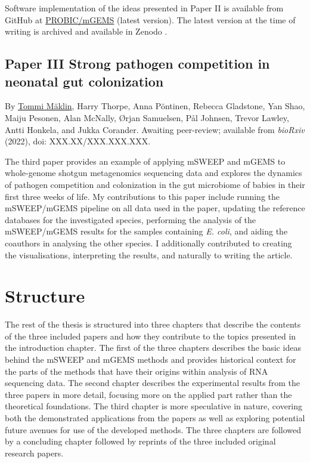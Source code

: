 \documentclass[officiallayout]{tktla}
\begin{document}
Software implementation of the ideas presented in Paper II is
available from GitHub at
\href{https://github.com/PROBIC/mGEMS}{PROBIC/mGEMS} (latest version).
The latest version at the time of writing is archived and available in
Zenodo \citep{maklin_mGEMS}.

\subsection*{Paper III \textemdash{ } Strong pathogen competition in neonatal gut colonization}
By \underline{Tommi Mäklin}, Harry Thorpe, Anna Pöntinen, Rebecca
Gladstone, Yan Shao, Maiju Pesonen, Alan McNally, Ørjan Samuelsen, Pål
Johnsen, Trevor Lawley, Antti Honkela, and Jukka Corander. Awaiting
peer-review; available from \textit{bioRxiv} (2022), doi:
XXX.XX/XXX.XXX.XXX.

The third paper \citep{maklin_strong_2022} provides an example of
applying mSWEEP and mGEMS to whole-genome shotgun metagenomics
sequencing data and explores the dynamics of pathogen competition and
colonization in the gut microbiome of babies in their first three
weeks of life. My contributions to this paper include running the
mSWEEP/mGEMS pipeline on all data used in the paper, updating the
reference databases for the investigated species, performing the
analysis of the mSWEEP/mGEMS results for the samples containing
\textit{E. coli}, and aiding the coauthors in analysing the other
species. I additionally contributed to creating the visualisations,
interpreting the results, and naturally to writing the article.

\section{Structure}

The rest of the thesis is structured into three chapters that describe
the contents of the three included papers and how they contribute to
the topics presented in the introduction chapter. The first of the
three chapters describes the basic ideas behind the mSWEEP and mGEMS
methods and provides historical context for the parts of the methods
that have their origins within analysis of RNA sequencing data. The
second chapter describes the experimental results from the three
papers in more detail, focusing more on the applied part rather than
the theoretical foundations. The third chapter is more speculative in
nature, covering both the demonstrated applications from the papers as
well as exploring potential future avenues for use of the developed
methods. The three chapters are followed by a concluding chapter
followed by reprints of the three included original research papers.
\end{document}
